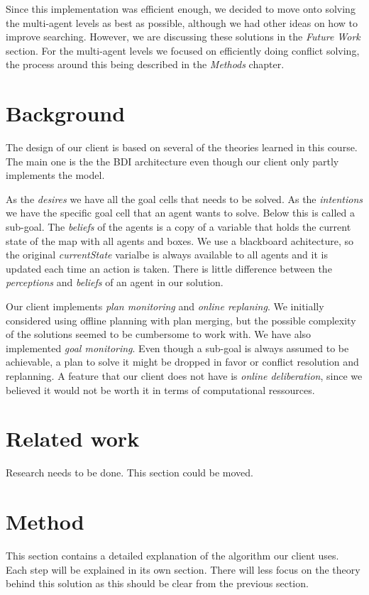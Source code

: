 \documentclass[letterpaper]{article}
\begin{document}
Since this implementation was efficient enough, we decided to move onto solving the multi-agent levels as best as possible, although we had other ideas on how to improve searching. However, we are discussing these solutions in the \textit{Future Work} section. For the multi-agent levels we focused on efficiently doing conflict solving, the process around this being described in the \textit{Methods} chapter.

\section{Background}
The design of our client is based on several of the theories learned in this course. The main one is the the BDI architecture even though our client only partly implements the model. 

As the \textit{desires} we have all the goal cells that needs to be solved. As the \textit{intentions} we have the specific goal cell that an agent wants to solve. Below this is called a sub-goal. The \textit{beliefs} of the agents is a copy of a variable that holds the current state of the map with all agents and boxes. We use a blackboard achitecture, so the original \textit{currentState} varialbe is always available to all agents and it is updated each time an action is taken. There is little difference between the \textit{perceptions} and \textit{beliefs} of an agent in our solution.

Our client implements \textit{plan monitoring} and \textit{online replaning}. We initially considered using offline planning with plan merging, but the possible complexity of the solutions seemed to be cumbersome to work with. We have also implemented \textit{goal monitoring}. Even though a sub-goal is always assumed to be achievable, a plan to solve it might be dropped in favor or conflict resolution and replanning. A feature that our client does not have is \textit{online deliberation}, since we believed it would not be worth it in terms of computational ressources. 

\section{Related work}
Research needs to be done. This section could be moved.

\section{Method}
This section contains a detailed explanation of the algorithm our client uses. Each step will be explained in its own section. There will less focus on the theory behind this solution as this should be clear from the previous section.
\end{document}
